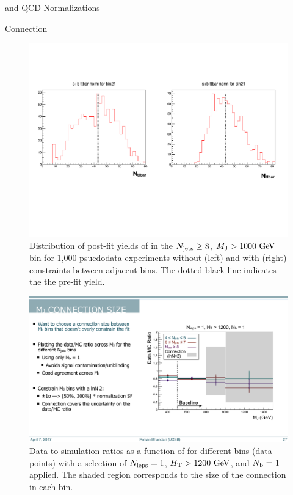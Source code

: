 \begin{section}{\ttbar and QCD Normalizations}
\begin{subsection}{\MJ Connection}
\begin{figure}[tbp!]
\centering
\includegraphics[angle=0,width=0.90\columnwidth]{fig/mj_connection_exps.pdf}
\caption{Distribution of post-fit yields of \ttbar in the $N_{\mathrm{jets}} \geq 8$, $M_\mathrm{J} > 1000~\mathrm{Ge\kern -0.1em V}$ bin for 1,000 psuedodata experiments without (left) and with (right) constraints between adjacent \MJ bins.
The dotted black line indicates the the pre-fit yield.}
\label{fig:mj_connection_exps}
\end{figure}

\begin{figure}[tbp!]
\centering
\includegraphics[angle=0,width=0.60\columnwidth]{fig/mj_connection.pdf}
\caption{Data-to-simulation ratios as a function of \MJ for different \Njets bins (data points) with a selection of $N_{\mathrm{leps}} = 1$, $H_\mathrm{T} > 1200~\mathrm{Ge\kern -0.1em V}$, and $N_\mathrm{b} = 1$ applied.
The shaded region corresponds to the size of the \MJ connection in each \MJ bin.}
\label{fig:mj_connection}
\end{figure}

\end{subsection}

\end{section}


